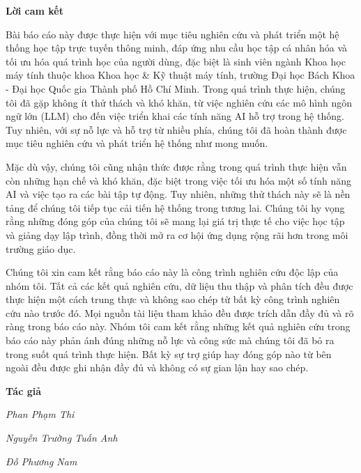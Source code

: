 \documentclass[12pt,a4paper]{report}
\theoremstyle{definition}
\begin{document}
\newpage
\begin{center}
    \textbf{\Large Lời cam kết}
\end{center}

\par Bài báo cáo này được thực hiện với mục tiêu nghiên cứu và phát triển một hệ thống học tập trực tuyến thông minh, đáp ứng nhu cầu học tập cá nhân hóa và tối ưu hóa quá trình học của người dùng, đặc biệt là sinh viên ngành Khoa học máy tính thuộc khoa Khoa học \& Kỹ thuật máy tính, trường Đại học Bách Khoa - Đại học Quốc gia Thành phố Hồ Chí Minh. Trong quá trình thực hiện, chúng tôi đã gặp không ít thử thách và khó khăn, từ việc nghiên cứu các mô hình ngôn ngữ lớn (LLM) cho đến việc triển khai các tính năng AI hỗ trợ trong hệ thống. Tuy nhiên, với sự nỗ lực và hỗ trợ từ nhiều phía, chúng tôi đã hoàn thành được mục tiêu nghiên cứu và phát triển hệ thống như mong muốn.
\par Mặc dù vậy, chúng tôi cũng nhận thức được rằng trong quá trình thực hiện vẫn còn những hạn chế và khó khăn, đặc biệt trong việc tối ưu hóa một số tính năng AI và việc tạo ra các bài tập tự động. Tuy nhiên, những thử thách này sẽ là nền tảng để chúng tôi tiếp tục cải tiến hệ thống trong tương lai. Chúng tôi hy vọng rằng những đóng góp của chúng tôi sẽ mang lại giá trị thực tế cho việc học tập và giảng dạy lập trình, đồng thời mở ra cơ hội ứng dụng rộng rãi hơn trong môi trường giáo dục.
\par Chúng tôi xin cam kết rằng báo cáo này là công trình nghiên cứu độc lập của nhóm tôi. Tất cả các kết quả nghiên cứu, dữ liệu thu thập và phân tích đều được thực hiện một cách trung thực và không sao chép từ bất kỳ công trình nghiên cứu nào trước đó. Mọi nguồn tài liệu tham khảo đều được trích dẫn đầy đủ và rõ ràng trong báo cáo này. Nhóm tôi cam kết rằng những kết quả nghiên cứu trong báo cáo này phản ánh đúng những nỗ lực và công sức mà chúng tôi đã bỏ ra trong suốt quá trình thực hiện. Bất kỳ sự trợ giúp hay đóng góp nào từ bên ngoài đều được ghi nhận đầy đủ và không có sự gian lận hay sao chép.

\par\hfill\textbf{Tác giả}\hspace{1cm}

\par\hfill\textit{Phan Phạm Thi}
\par\hfill\textit{Nguyễn Trường Tuấn Anh}\hspace{0.3cm}
\par\hfill\textit{Đỗ Phương Nam}\hspace{0.2cm}
\newpage
\end{document}

